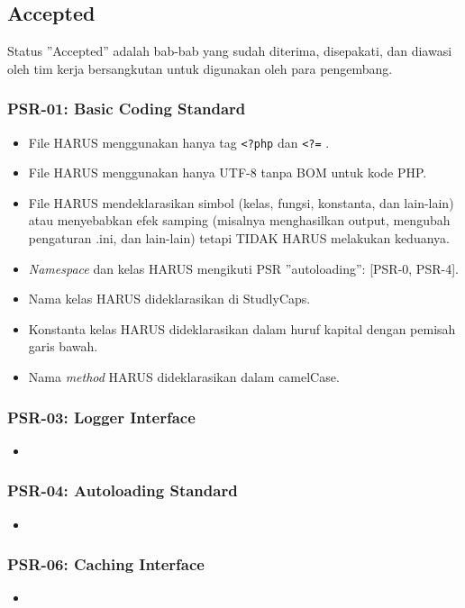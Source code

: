 \subsection{Accepted}
\label{subsec:accepted}
Status ''Accepted'' adalah bab-bab yang sudah diterima, disepakati, dan diawasi oleh tim kerja bersangkutan untuk digunakan oleh para pengembang.

\subsubsection{PSR-01: Basic Coding Standard}
\label{subsubsec:psr01}
\begin{itemize}
	\item File HARUS menggunakan hanya tag \verb|<?php|  dan \verb|<?=| .
	\item File HARUS menggunakan hanya UTF-8 tanpa BOM untuk kode PHP.
	\item File HARUS mendeklarasikan simbol (kelas, fungsi, konstanta, dan lain-lain) atau menyebabkan efek samping (misalnya menghasilkan output, mengubah pengaturan .ini, dan lain-lain) tetapi TIDAK HARUS melakukan keduanya.
	\item \textit{Namespace} dan kelas HARUS mengikuti PSR ''autoloading'': [PSR-0, PSR-4].
	\item Nama kelas HARUS dideklarasikan di StudlyCaps.
	\item Konstanta kelas HARUS dideklarasikan dalam huruf kapital dengan pemisah garis bawah.
	\item Nama \textit{method} HARUS dideklarasikan dalam camelCase.
\end{itemize}

\subsubsection{PSR-03: Logger Interface}
\label{subsubsec:psr03}
\begin{itemize}
	\item
\end{itemize}

\subsubsection{PSR-04: Autoloading Standard}
\label{subsubsec:psr04}
\begin{itemize}
	\item
\end{itemize}

\subsubsection{PSR-06: Caching Interface}
\label{subsubsec:psr06}
\begin{itemize}
	\item
\end{itemize}

